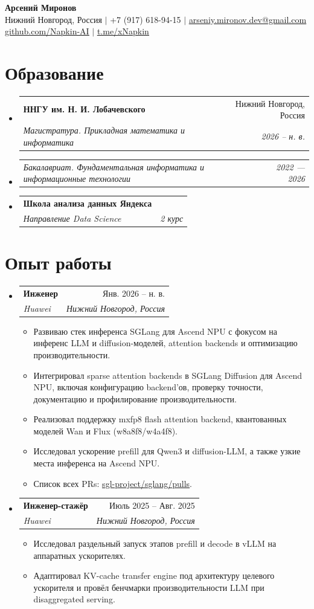 \documentclass[letterpaper,10pt]{article}
\makeatletter
\newcommand{\resumeItem}[1]{\item\small{#1\vspace{-1pt}}}
\newcommand{\resumeSubheading}[4]{
  \vspace{0pt}\item
  \begin{tabular*}{0.98\textwidth}[t]{l@{\extracolsep{\fill}}r}
    \textbf{#1} & #2 \\
    \textit{\small #3} & \textit{\small #4} \\
  \end{tabular*}\vspace{-6pt}
}
\newcommand{\resumeSubSubheading}[2]{
  \item
  \begin{tabular*}{0.98\textwidth}{l@{\extracolsep{\fill}}r}
    \textit{\small #1} & \textit{\small #2} \\
  \end{tabular*}\vspace{-6pt}
}
\newcommand{\resumeSubHeadingListStart}{\begin{itemize}[leftmargin=0.14in,label={}]}
\newcommand{\resumeSubHeadingListEnd}{\end{itemize}}
\newcommand{\resumeItemListStart}{\begin{itemize}[leftmargin=0.22in,itemsep=1pt,topsep=2pt]}
\newcommand{\resumeItemListEnd}{\end{itemize}\vspace{-5pt}}
\makeatother
\begin{document}
\begin{center}
  \textbf{\Huge Арсений Миронов} \\ \vspace{2pt}
  \small Нижний Новгород, Россия $|$ +7 (917) 618-94-15 $|$
  \href{mailto:arseniy.mironov.dev@gmail.com}{\underline{arseniy.mironov.dev@gmail.com}} \\
  \href{https://github.com/Napkin-AI}{\underline{github.com/Napkin-AI}} $|$
  \href{https://t.me/xNapkin}{\underline{t.me/xNapkin}}
\end{center}

\section{Образование}
\resumeSubHeadingListStart
  \resumeSubheading
    {ННГУ им. Н. И. Лобачевского}{Нижний Новгород, Россия}
    {Магистратура. Прикладная математика и информатика}{2026 -- н. в.}
  \resumeSubSubheading
    {Бакалавриат. Фундаментальная информатика и информационные технологии}{2022 --- 2026}
  \resumeSubheading
    {Школа анализа данных Яндекса}{ }
    {Направление Data Science}{2 курс}
\resumeSubHeadingListEnd

\section{Опыт работы}
\resumeSubHeadingListStart
  \resumeSubheading
    {Инженер}{Янв. 2026 -- н. в.}
    {Huawei}{Нижний Новгород, Россия}
  \resumeItemListStart
    \resumeItem{Развиваю стек инференса SGLang для Ascend NPU с фокусом на инференс LLM и diffusion-моделей, attention backends и оптимизацию производительности.}
    \resumeItem{Интегрировал sparse attention backends в SGLang Diffusion для Ascend NPU, включая конфигурацию backend'ов, проверку точности, документацию и профилирование производительности.}
    \resumeItem{Реализовал поддержку mxfp8 flash attention backend, квантованных моделей Wan и Flux (w8a8f8/w4a4f8).}
    \resumeItem{Исследовал ускорение prefill для Qwen3 и diffusion-LLM, а также узкие места инференса на Ascend NPU.}
    \resumeItem{Список всех PRs: \href{https://github.com/sgl-project/sglang/pulls?q=is\%3Apr+state\%3Aclosed+author\%3ANapkin-AI}{\underline{sgl-project/sglang/pulls}}.}
  \resumeItemListEnd

  \resumeSubheading
    {Инженер-стажёр}{Июль 2025 -- Авг. 2025}
    {Huawei}{Нижний Новгород, Россия}
  \resumeItemListStart
    \resumeItem{Исследовал раздельный запуск этапов prefill и decode в vLLM на аппаратных ускорителях.}
    \resumeItem{Адаптировал KV-cache transfer engine под архитектуру целевого ускорителя и провёл бенчмарки производительности LLM при disaggregated serving.}
  \resumeItemListEnd
\resumeSubHeadingListEnd
\end{document}
